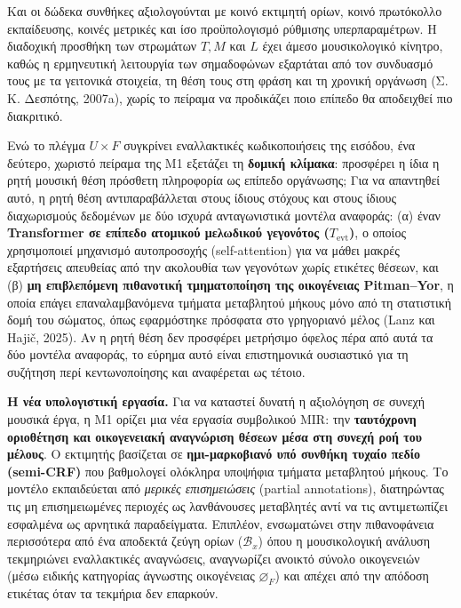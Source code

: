 \documentclass[11pt,a4paper]{article}
\begin{document}
Και οι δώδεκα συνθήκες αξιολογούνται με κοινό εκτιμητή ορίων, κοινό πρωτόκολλο εκπαίδευσης, κοινές μετρικές και ίσο προϋπολογισμό ρύθμισης υπερπαραμέτρων. Η διαδοχική προσθήκη των στρωμάτων \(T, M\) και \(L\) έχει άμεσο μουσικολογικό κίνητρο, καθώς η ερμηνευτική λειτουργία των σημαδοφώνων εξαρτάται από τον συνδυασμό τους με τα γειτονικά στοιχεία, τη θέση τους στη φράση και τη χρονική οργάνωση (Σ. Κ. Δεσπότης, 2007a), χωρίς το πείραμα να προδικάζει ποιο επίπεδο θα αποδειχθεί πιο διακριτικό.

Ενώ το πλέγμα \(U\times F\) συγκρίνει εναλλακτικές κωδικοποιήσεις της εισόδου, ένα δεύτερο, χωριστό πείραμα της Μ1 εξετάζει τη \textbf{δομική κλίμακα}: προσφέρει η ίδια η ρητή μουσική θέση πρόσθετη πληροφορία ως επίπεδο οργάνωσης; Για να απαντηθεί αυτό, η ρητή θέση αντιπαραβάλλεται στους ίδιους στόχους και στους ίδιους διαχωρισμούς δεδομένων με δύο ισχυρά ανταγωνιστικά μοντέλα αναφοράς: (α) έναν \textbf{Transformer σε επίπεδο ατομικού μελωδικού γεγονότος (\(T_{\mathrm{evt}}\))}, ο οποίος χρησιμοποιεί μηχανισμό αυτοπροσοχής (self-attention) για να μάθει μακρές εξαρτήσεις απευθείας από την ακολουθία των γεγονότων χωρίς ετικέτες θέσεων, και (β) \textbf{μη επιβλεπόμενη πιθανοτική τμηματοποίηση της οικογένειας Pitman--Yor}, η οποία επάγει επαναλαμβανόμενα τμήματα μεταβλητού μήκους μόνο από τη στατιστική δομή του σώματος, όπως εφαρμόστηκε πρόσφατα στο γρηγοριανό μέλος (Lanz και Hajič, 2025). Αν η ρητή θέση δεν προσφέρει μετρήσιμο όφελος πέρα από αυτά τα δύο μοντέλα αναφοράς, το εύρημα αυτό είναι επιστημονικά ουσιαστικό για τη συζήτηση περί κεντωνοποίησης και αναφέρεται ως τέτοιο.

\textbf{Η νέα υπολογιστική εργασία.} Για να καταστεί δυνατή η αξιολόγηση σε συνεχή μουσικά έργα, η Μ1 ορίζει μια νέα εργασία συμβολικού MIR: την \textbf{ταυτόχρονη οριοθέτηση και οικογενειακή αναγνώριση θέσεων μέσα στη συνεχή ροή του μέλους}. Ο εκτιμητής βασίζεται σε \textbf{ημι-μαρκοβιανό υπό συνθήκη τυχαίο πεδίο (semi-CRF)} που βαθμολογεί ολόκληρα υποψήφια τμήματα μεταβλητού μήκους. Το μοντέλο εκπαιδεύεται από \emph{μερικές επισημειώσεις} (partial annotations), διατηρώντας τις μη επισημειωμένες περιοχές ως λανθάνουσες μεταβλητές αντί να τις αντιμετωπίζει εσφαλμένα ως αρνητικά παραδείγματα. Επιπλέον, ενσωματώνει στην πιθανοφάνεια περισσότερα από ένα αποδεκτά ζεύγη ορίων (\(\mathcal{B}_x\)) όπου η μουσικολογική ανάλυση τεκμηριώνει εναλλακτικές αναγνώσεις, αναγνωρίζει ανοικτό σύνολο οικογενειών (μέσω ειδικής κατηγορίας άγνωστης οικογένειας \(\varnothing_F\)) και απέχει από την απόδοση ετικέτας όταν τα τεκμήρια δεν επαρκούν.
\end{document}
